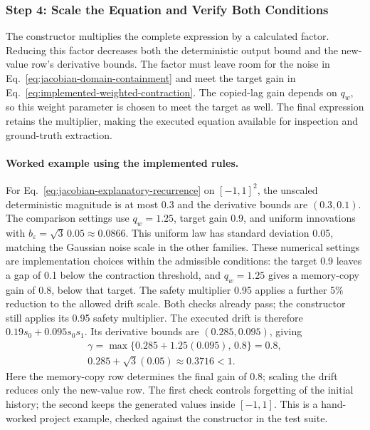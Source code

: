 \subsubsection{Step 4: Scale the Equation and Verify Both Conditions}
The constructor multiplies the complete expression by a calculated factor.
Reducing this factor decreases both the
deterministic output bound and the new-value row's derivative bounds. The
factor must leave room for the noise in
Eq.~\eqref{eq:jacobian-domain-containment} and meet the target gain in
Eq.~\eqref{eq:implemented-weighted-contraction}. The copied-lag gain depends
on $q_w$, so this weight parameter is chosen to meet the target as well.
The final expression retains the multiplier, making the executed equation
available for inspection and ground-truth extraction.

\paragraph{Worked example using the implemented rules.}
For Eq.~\eqref{eq:jacobian-explanatory-recurrence} on $[-1,1]^2$, the
unscaled deterministic magnitude is at most 0.3 and the derivative bounds
are $(0.3,0.1)$. The comparison settings use $q_w=1.25$, target gain 0.9,
and uniform innovations with
$b_\varepsilon=\sqrt{3}\,0.05\approx0.0866$. This uniform law has standard
deviation 0.05, matching the Gaussian noise scale in the other families.
These numerical settings are implementation choices within the admissible
conditions: the target 0.9 leaves a gap of 0.1 below the contraction threshold,
and $q_w=1.25$ gives a memory-copy gain of 0.8, below that target. The safety
multiplier 0.95 applies a further 5\% reduction to the allowed drift scale.
Both checks already pass; the constructor still applies its 0.95 safety
multiplier. The executed drift is therefore
$0.19s_0+0.095s_0s_1$. Its derivative bounds are $(0.285,0.095)$, giving
\begin{equation}
\begin{gathered}
 \gamma=\max\{0.285+1.25(0.095),\,0.8\}=0.8,
 \\
 0.285+\sqrt{3}(0.05)\approx0.3716<1.
\end{gathered}
 \label{eq:jacobian-worked-checks}
\end{equation}
Here the memory-copy row determines the final gain of 0.8; scaling the drift
reduces only the new-value row. The first check controls forgetting of the
initial history; the second
keeps the generated values inside $[-1,1]$. This is a hand-worked project
example, checked against the constructor in the test suite.

